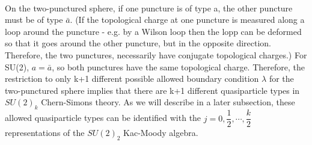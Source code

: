  \paragraph{} On the two-punctured sphere, if one puncture is of type a,
  the other puncture must be of type $\bar{a}$. (If the topological charge at one puncture is measured along a loop around
  the puncture - e.g. by a Wilson loop then the lopp can be deformed so that it goes around the other puncture, but in the
  opposite direction. Therefore, the two punctures, necessarily have conjugate topological charges.)
  For SU(2), $a = \bar{a}$, so both punctures have the same topological charge. 
  Therefore, the restriction to only k+1 different possible allowed boundary condition $\lambda$ for the two-punctured 
  sphere implies that there are k+1 different quasiparticle types in $SU(2)_{k}$ Chern-Simons theory. As we will describe in a later
  subsection, these allowed quasiparticle types can be identified with the $j = 0,\dfrac{1}{2},\cdots,\dfrac{k}{2}$
  representations of the $SU(2)_{2}$ Kac-Moody algebra. 